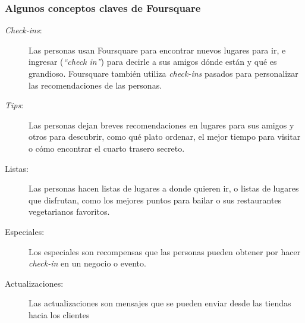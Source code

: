 \subsubsection{Algunos conceptos claves de Foursquare}
\begin{description}
\item[\textit{Check-ins}:] Las personas usan Foursquare para encontrar nuevos lugares para ir, e ingresar (\textit{“check in”}) para decirle a sus amigos d\'onde est\'an y qu\'e es grandioso. Foursquare tambi\'en utiliza \textit{check-ins} pasados para personalizar las recomendaciones de las personas.
\item[\textit{Tips}:] Las personas dejan breves recomendaciones en lugares para sus amigos y otros para descubrir, como qu\'e plato ordenar, el mejor tiempo para visitar o c\'omo encontrar el cuarto trasero secreto.
\item[Listas:] Las personas hacen listas de lugares a donde quieren ir, o listas de lugares que disfrutan, como los mejores puntos para bailar o sus restaurantes vegetarianos favoritos.
\item[Especiales:] Los especiales son recompensas que las personas pueden obtener por hacer \textit{check-in} en un negocio o evento.
\item[Actualizaciones:] Las actualizaciones son mensajes que se pueden enviar desde las tiendas hacia los clientes
\end{description}
\pagebreak